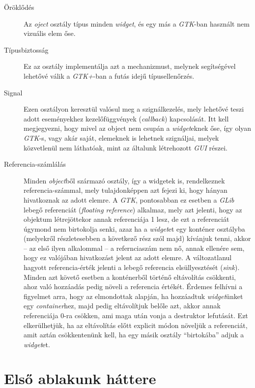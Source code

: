 \begin{description}
 \item[Öröklődés] Az \textit{oject} osztály típus minden \textit{widget}, és egy más a \textit{GTK}-ban használt nem vizuális elem őse.

 \item[Típusbiztosság] Ez az osztály implementálja azt a mechanizmust, melynek segítségével lehetővé válik a \textit{GTK+}-ban a futás idejű típusellenőrzés.

 \item[Signal] Ezen osztályon keresztül valósul meg a szignálkezelés, mely lehetővé teszi adott eseményekhez kezelőfüggvények (\textit{callback}) kapcsolását. Itt kell megjegyezni, hogy mivel az object nem csupán a \textit{widget}eknek őse, így olyan \textit{GTK}-s, vagy akár saját, elemeknek is lehetnek szignáljai, melyek közvetlenül nem láthatóak, mint az általunk létrehozott \textit{GUI} részei.

 \item[Referencia-számlálás] Minden \textit{object}ből származó osztály, így a widgetek is, rendelkeznek referencia-számmal, mely tulajdonképpen azt fejezi ki, hogy hányan hivatkoznak az adott elemre. A \textit{GTK}, pontosabban ez esetben a \textit{GLib} lebegő referenciát (\textit{floating reference}) alkalmaz, mely azt jelenti, hogy az objektum létrejöttekor annak referenciája 1 lesz, de ezt a referenciát úgymond nem birtokolja senki, azaz ha a \textit{widget}et egy konténer osztályba (melyekről részletesebben a következő rész szól majd) kívánjuk tenni, akkor -- az első ilyen alkalommal -- a refernciaszám nem nő, annak ellenére sem, hogy ez valójában hivatkozást jelent az adott elemre. A változatlanul hagyott referencia-érték jelenti a lebegő referencia elsüllyesztését (\textit{sink}). Minden azt követő esetben a konténerből történő eltávolítás csökkenti, ahoz való hozzáadás pedig növeli a referencia értékét. Érdemes felhívni a figyelmet arra, hogy az elmondottak alapján, ha hozzáadtuk \textit{widget}ünket egy \textit{container}hez, majd pedig eltávolítjuk belőle azt, akkor annak referenciája 0-ra csökken, ami maga után vonja a destruktor lefutását. Ezt elkerülhetjük, ha az eltávolítás előtt explicit módon növeljük a referenciát, amit aztán csökkentenünk kell, ha egy másik osztály ``birtokába'' adjuk a \textit{widget}et.
\end{description}

\section{Első ablakunk háttere}


